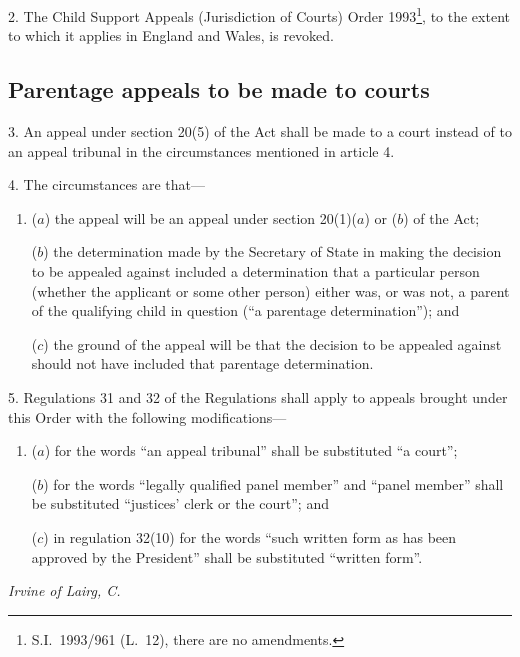 \documentclass[12pt,a4paper]{article}
\begin{document}
2.  The Child Support Appeals (Jurisdiction of Courts) Order 1993\footnote{S.I.\ 1993/961 (L.\ 12), there are no amendments.}, to the extent to which it applies in England and Wales, is revoked.

\subsection[3--5. Parentage appeals to be made to courts]{Parentage appeals to be made to courts}

3.  An appeal under section 20(5) of the Act shall be made to a court instead of to an appeal tribunal in the circumstances mentioned in article 4.

\medskip

4.  The circumstances are that—
\begin{enumerate}\item[]
($a$) the appeal will be an appeal under section 20(1)($a$)  or ($b$)  of the Act;

($b$) the determination made by the Secretary of State in making the decision to be appealed against included a determination that a particular person (whether the applicant or some other person) either was, or was not, a parent of the qualifying child in question (“a parentage determination”); and

($c$) the ground of the appeal will be that the decision to be appealed against should not have included that parentage determination.
\end{enumerate}

\medskip

5.  Regulations 31 and 32 of the Regulations shall apply to appeals brought under this Order with the following modifications—
\begin{enumerate}\item[]
($a$) for the words “an appeal tribunal” shall be substituted “a court”;

($b$) for the words “legally qualified panel member” and “panel member” shall be substituted “justices' clerk or the court”; and

($c$) in regulation 32(10) for the words “such written form as has been approved by the President” shall be substituted “written form”.
\end{enumerate}

\bigskip


{\raggedleft
\emph{Irvine of Lairg, C.}%

}
\end{document}
